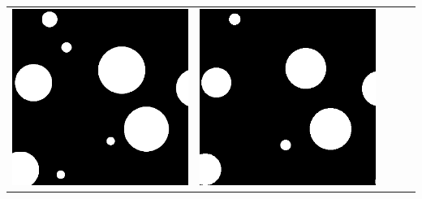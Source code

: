 \begin{table}[h!]
\begin{tabularx}{\textwidth}{>{\centering}m{}
			>{\centering}m{}
			>{\centering}m{}
			>{\centering}m{}
			>{\centering\arraybackslash}m{}}
		\includegraphics[width=0.9\linewidth]{images/gen/results_robbins/postprocessing/thm_dir_N-30_210.png_tile_100.png} &
		\includegraphics[width=0.9\linewidth]{images/gen/results_robbins/gt/thm_dir_N-30_210.png_tile_100.png} \\
		

\end{tabularx}
\end{table}
